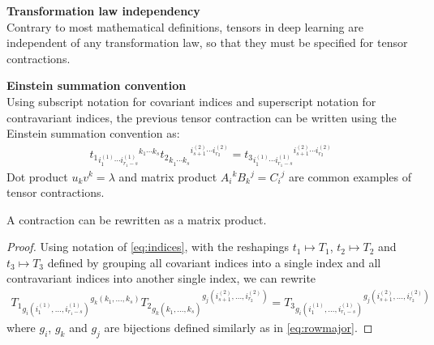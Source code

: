 \begin{remark}\textbf{Transformation law independency}\\
Contrary to most mathematical definitions, tensors in deep learning are independent of any transformation law, so that they must be specified for tensor contractions.
\end{remark}

\begin{remark}\textbf{Einstein summation convention}\\
Using subscript notation for covariant indices and superscript notation for contravariant indices, the previous tensor contraction can be written using the Einstein summation convention as:
\begin{gather}
t_1 \hspace{0pt}_{i_1^{(1)} \cdots i_{r_1-s}^{(1)} } \hspace{0pt}^{ k_1 \cdots k_s} 
t_2 \hspace{0pt}_{ k_1^{\phantom{(}} \cdots k_s^{\phantom{(}}} \hspace{0pt}^{i_{s+1}^{(2)} \cdots i_{r_2}^{(2)}} =
t_3 \hspace{0pt}_ {i_1^{(1)} \cdots i_{r_1-s}^{(1)} } \hspace{0pt}^{i_{s+1}^{(2)} \cdots i_{r_2}^{(2)}}
\label{eq:indices}
\end{gather}
Dot product $u_k v^k = \lambda $ and matrix product $A_i\hspace{0pt}^k B_k\hspace{0pt}^j = C_i\hspace{0pt}^j$ are common examples of tensor contractions.
\end{remark}

\begin{proposition}%
A contraction can be rewritten as a matrix product.
\label{prop:matprodeq}
\end{proposition}
\begin{proof}
Using notation of \eqref{eq:indices}, with the reshapings $t_1 \mapsto T_1$, $t_2 \mapsto T_2$ and $t_3 \mapsto T_3$ defined by grouping all covariant indices into a single index and all contravariant indices into another single index, we can rewrite
\begin{gather*}
T_1 \hspace{0pt}_{g_i(i_1^{(1)}, \ldots, i_{r_1-s}^{(1)})} \hspace{0pt}^{g_k(k_1, \ldots, k_s)} 
T_2 \hspace{0pt}_{g_k(k_1^{\phantom{(}}, \ldots, k_s^{\phantom{(}})} \hspace{0pt}^{g_j(i_{s+1}^{(2)}, \ldots, i_{r_2}^{(2)})} =
T_3 \hspace{0pt}_ {g_i(i_1^{(1)}, \ldots, i_{r_1-s}^{(1)})} \hspace{0pt}^{g_j(i_{s+1}^{(2)}, \ldots, i_{r_2}^{(2)})}
\end{gather*}
where $g_i$, $g_k$ and $g_j$ are bijections defined similarly as in \eqref{eq:rowmajor}.
\end{proof}

